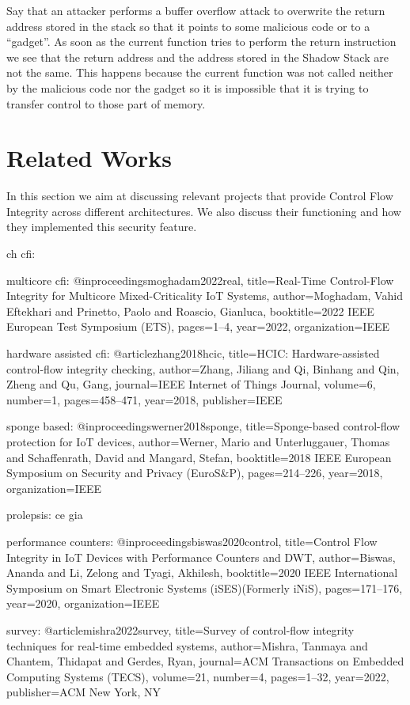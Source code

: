 Say that an attacker performs a buffer overflow attack to overwrite the return
address stored in the stack so that it points to some malicious code or to a ``gadget''.
As soon as the current function tries to perform the return instruction we see that
the return address and the address stored in the Shadow Stack are not the same.
This happens because the current function was not called neither by the
malicious code nor the gadget so it is impossible that it is trying to transfer
control to those part of memory.

\section{Related Works}
\label{sec:background_related}

In this section we aim at discussing relevant projects that provide Control Flow
Integrity across different architectures. We also discuss their functioning and
how they implemented this security feature.

ch cfi: 

multicore cfi: @inproceedings{moghadam2022real, title={Real-Time Control-Flow Integrity for Multicore Mixed-Criticality IoT Systems}, author={Moghadam, Vahid Eftekhari and Prinetto, Paolo and Roascio, Gianluca}, booktitle={2022 IEEE European Test Symposium (ETS)}, pages={1--4}, year={2022}, organization={IEEE} }

hardware assisted cfi: @article{zhang2018hcic, title={HCIC: Hardware-assisted control-flow integrity checking}, author={Zhang, Jiliang and Qi, Binhang and Qin, Zheng and Qu, Gang}, journal={IEEE Internet of Things Journal}, volume={6}, number={1}, pages={458--471}, year={2018}, publisher={IEEE} }

sponge based: @inproceedings{werner2018sponge, title={Sponge-based control-flow protection for IoT devices}, author={Werner, Mario and Unterluggauer, Thomas and Schaffenrath, David and Mangard, Stefan}, booktitle={2018 IEEE European Symposium on Security and Privacy (EuroS\&P)}, pages={214--226}, year={2018}, organization={IEEE} }

prolepsis: ce gia

performance counters: @inproceedings{biswas2020control, title={Control Flow Integrity in IoT Devices with Performance Counters and DWT}, author={Biswas, Ananda and Li, Zelong and Tyagi, Akhilesh}, booktitle={2020 IEEE International Symposium on Smart Electronic Systems (iSES)(Formerly iNiS)}, pages={171--176}, year={2020}, organization={IEEE} }

survey: @article{mishra2022survey, title={Survey of control-flow integrity techniques for real-time embedded systems}, author={Mishra, Tanmaya and Chantem, Thidapat and Gerdes, Ryan}, journal={ACM Transactions on Embedded Computing Systems (TECS)}, volume={21}, number={4}, pages={1--32}, year={2022}, publisher={ACM New York, NY} }